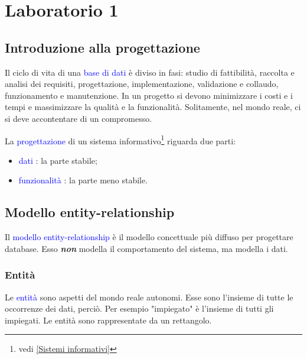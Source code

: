 \chapter{Laboratorio 1}

\section{Introduzione alla progettazione}

Il ciclo di vita di una \textcolor{blue}{base  di dati} è diviso in fasi: studio di fattibilità, raccolta e analisi dei requisiti, progettazione, implementazione, validazione e collaudo, funzionamento e manutenzione. In un progetto si devono minimizzare i costi e i tempi e massimizzare la qualità e la funzionalità. Solitamente, nel mondo reale, ci si deve accontentare di un compromesso. 

La \textcolor{blue}{progettazione} di un sistema informativo\footnote{vedi \ref{Sistemi informativi}} riguarda due parti:

\begin{itemize}
    \item \textcolor{blue}{dati} : la parte stabile;
    \item \textcolor{blue}{funzionalità} : la parte meno stabile.
\end{itemize}

\section{Modello entity-relationship}

Il \textcolor{blue}{modello entity-relationship} è il modello concettuale più diffuso per progettare database. Esso \textbf{\textit{non}} modella il comportamento del sistema, ma modella i dati.

\subsection{Entità}

Le \textcolor{blue}{entità} sono aspetti del mondo reale autonomi. Esse sono l'insieme di tutte le occorrenze dei dati, perciò. Per esempio "impiegato" è l'insieme di tutti gli impiegati. Le entità sono rappresentate da un rettangolo.

\begin{center}
\end{center}

